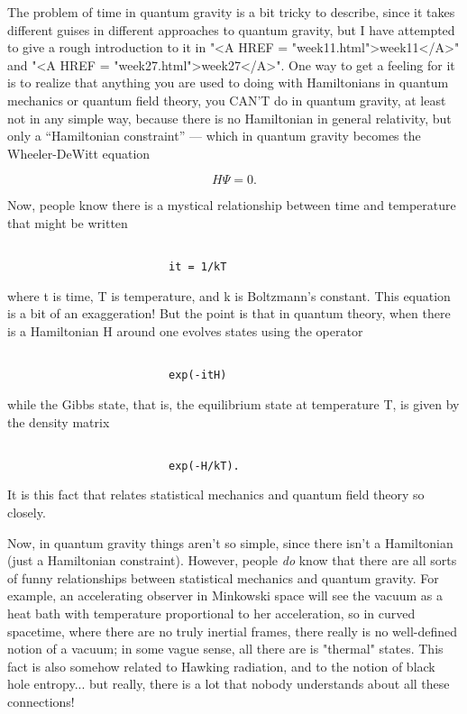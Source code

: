 The problem of time in quantum gravity is a bit tricky to describe,
since it takes different guises in different approaches to quantum
gravity, but I have attempted to give a rough introduction to it in
"<A HREF = "week11.html">week11</A>" and "<A HREF = "week27.html">week27</A>".  One way to get a feeling for it is to realize
that anything you are used to doing with Hamiltonians in quantum
mechanics or quantum field theory, you CAN'T do in quantum gravity, at
least not in any simple way, because there is no Hamiltonian in general
relativity, but only a ``Hamiltonian constraint'' --- which in quantum
gravity becomes the Wheeler-DeWitt equation


$$

                         H \Psi  = 0.
$$
    

Now, people know there is a mystical relationship between time and
temperature that might be written


\begin{verbatim}

                         it = 1/kT
\end{verbatim}
    

where t is time, T is temperature, and k is Boltzmann's constant.  This
equation is a bit of an exaggeration!  But the point is that in quantum
theory, when there is a Hamiltonian H around one evolves states using the
operator 


\begin{verbatim}

                         exp(-itH)
\end{verbatim}
    

while the Gibbs state, that is, the equilibrium state at temperature T,
is given by the density matrix


\begin{verbatim}

                         exp(-H/kT).
\end{verbatim}
    

It is this fact that relates statistical mechanics and quantum field
theory so closely.  

Now, in quantum gravity things aren't so simple, since there isn't a 
Hamiltonian (just a Hamiltonian constraint).  However, people \emph{do} know
that there are all sorts of funny relationships between statistical
mechanics and quantum gravity.  For example, an accelerating observer in
Minkowski space will see the vacuum as a heat bath with temperature
proportional to her acceleration, so in curved spacetime, where there
are no truly inertial frames, there really is no well-defined notion of
a vacuum; in some vague sense, all there are is "thermal" states.
This fact is also somehow related to Hawking radiation, and to the
notion of black hole entropy... but really, there is a lot that nobody
understands about all these connections!  

